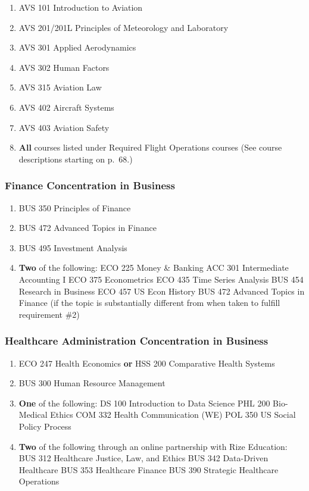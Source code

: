 \documentclass[
  letterpaper,
]{scrbook}
\providecommand{\tightlist}{%
  \setlength{\itemsep}{0pt}\setlength{\parskip}{0pt}}
\begin{document}
\begin{enumerate}
\def\labelenumi{\arabic{enumi}.}
\tightlist
\item
  AVS 101 Introduction to Aviation
\item
  AVS 201/201L Principles of Meteorology and Laboratory
\item
  AVS 301 Applied Aerodynamics
\item
  AVS 302 Human Factors
\item
  AVS 315 Aviation Law
\item
  AVS 402 Aircraft Systems
\item
  AVS 403 Aviation Safety
\item
  \textbf{All} courses listed under Required Flight Operations courses
  (See course descriptions starting on p.~68.)
\end{enumerate}

\subsubsection{Finance Concentration in
Business}\label{finance-concentration-in-business}

\begin{enumerate}
\def\labelenumi{\arabic{enumi}.}
\tightlist
\item
  BUS 350 Principles of Finance
\item
  BUS 472 Advanced Topics in Finance
\item
  BUS 495 Investment Analysis
\item
  \textbf{Two} of the following: ECO 225 Money \& Banking ACC 301
  Intermediate Accounting I ECO 375 Econometrics ECO 435 Time Series
  Analysis BUS 454 Research in Business ECO 457 US Econ History BUS 472
  Advanced Topics in Finance (if the topic is substantially different
  from when taken to fulfill requirement \#2)
\end{enumerate}

\subsubsection{Healthcare Administration Concentration in
Business}\label{healthcare-administration-concentration-in-business}

\begin{enumerate}
\def\labelenumi{\arabic{enumi}.}
\tightlist
\item
  ECO 247 Health Economics \textbf{or} HSS 200 Comparative Health
  Systems
\item
  BUS 300 Human Resource Management
\item
  \textbf{One} of the following: DS 100 Introduction to Data Science PHL
  200 Bio-Medical Ethics COM 332 Health Communication (WE) POL 350 US
  Social Policy Process
\item
  \textbf{Two} of the following through an online partnership with Rize
  Education: BUS 312 Healthcare Justice, Law, and Ethics BUS 342
  Data-Driven Healthcare BUS 353 Healthcare Finance BUS 390 Strategic
  Healthcare Operations
\end{enumerate}
\end{document}
